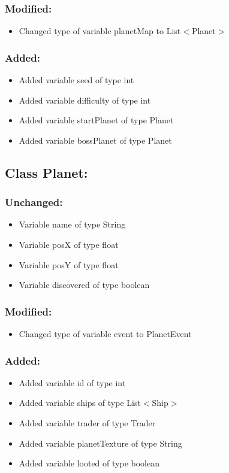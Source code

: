 \documentclass{article}
\begin{document}
\subsubsection{Modified:}
\begin{itemize}
\item Changed type of variable planetMap to List$<$Planet$>$
\end{itemize}

\subsubsection{Added:}
\begin{itemize}
\item Added variable seed of type int
\item Added variable difficulty of type int
\item Added variable startPlanet of type Planet
\item Added variable bossPlanet of type Planet
\end{itemize}


\subsection{Class Planet:}

\subsubsection{Unchanged:}
\begin{itemize}
\item Variable name of type String
\item Variable posX of type float
\item Variable posY of type float
\item Variable discovered of type boolean
\end{itemize}

\subsubsection{Modified:}
\begin{itemize}
\item Changed type of variable event to PlanetEvent
\end{itemize}

\subsubsection{Added:}
\begin{itemize}
\item Added variable id of type int
\item Added variable ships of type List$<$Ship$>$
\item Added variable trader of type Trader
\item Added variable planetTexture of type String
\item Added variable looted of type boolean
\end{itemize}
\end{document}
